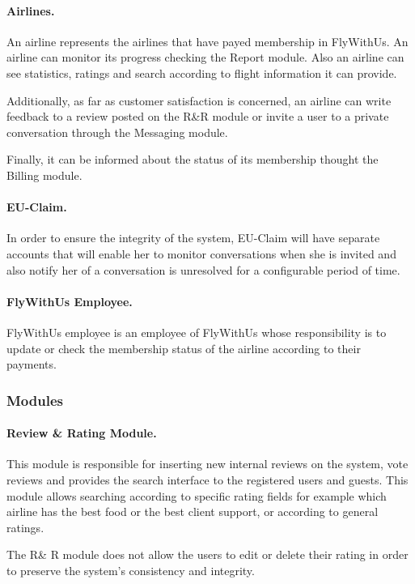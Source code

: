 \paragraph{Airlines.} An airline represents the airlines that have payed membership in FlyWithUs. An airline can monitor its progress checking the Report module. Also an airline can see statistics, ratings and search according to flight information it can provide. 

Additionally, as far as customer satisfaction is concerned, an airline can write feedback to a review posted on the R\&R module or invite a user to a private conversation through the Messaging module.

Finally, it can be informed about the status of its membership thought the Billing module.

\paragraph{EU-Claim.} In order to ensure the integrity of the system, EU-Claim will have separate accounts that will enable her to monitor conversations when she is invited and also notify her of a conversation is unresolved for a configurable period of time.

\paragraph{FlyWithUs Employee.} FlyWithUs employee is an employee of FlyWithUs whose responsibility is to update or check the membership status of the airline according to their payments.

\subsubsection{Modules}
\paragraph{Review \& Rating Module.} This module is responsible for inserting new internal reviews on the system, vote reviews and provides the search interface to the registered users and guests. This module allows searching according to specific rating fields for example which airline has the best food or the best client support, or according to general ratings. 

The R\& R module does not allow the users to  edit or delete their rating in order to preserve the system's consistency and integrity.

